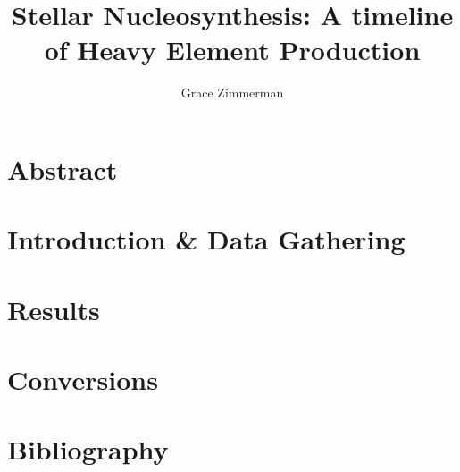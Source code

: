 \documentclass{article}
\author{Grace Zimmerman}
\title{Stellar Nucleosynthesis: A timeline of Heavy Element Production}
\begin{document}
\maketitle

\section{Abstract}

\section{Introduction \& Data Gathering}

\section{Results}

\section{Conversions}

\section{Bibliography}
\end{document}
